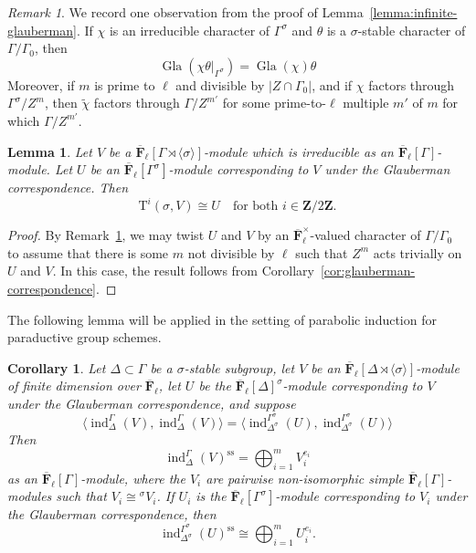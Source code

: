 \documentclass[reqno]{amsart}
\numberwithin{equation}{subsection}
\newcommand{\F}{\mathbf{F}}
\newcommand{\Z}{\mathbf{Z}}
\newcommand{\ol}[1]{\overline{#1}}
\DeclareMathOperator{\ind}{ind}
\DeclareMathOperator{\Gla}{Gla}
\newcommand{\rT}{\ensuremath{\mathrm{T}}\xspace}
\renewcommand{\ss}{\mathrm{ss}}
\newtheorem{lemma}[thm]{Lemma}
\newtheorem{cor}[thm]{Corollary}
\theoremstyle{remark}
\newtheorem{remark}[thm]{Remark}
\numberwithin{equation}{subsection}
\numberwithin{figure}{subsection}
\begin{document}
\begin{remark}\label{rmk:glauberman-twisting-equivariance}
We record one observation from the proof of Lemma~\ref{lemma:infinite-glauberman}. If $\chi$ is an irreducible character of $\Gamma^\sigma$ and $\theta$ is a $\sigma$-stable character of $\Gamma/\Gamma_0$, then
\[
\Gla(\chi\theta|_{\Gamma^\sigma})=\Gla(\chi)\theta
\]
Moreover, if $m$ is prime to $\ell$ and divisible by $|Z\cap\Gamma_0|$, and if $\chi$ factors through $\Gamma^\sigma/Z^m$, then $\widetilde\chi$ factors through $\Gamma/Z^{m'}$ for some prime-to-$\ell$ multiple $m'$ of $m$ for which $\Gamma/Z^{m'}$.
\end{remark}

\begin{lemma}\label{lemma:tate-cohom-infinite-glauberman}
    Let $V$ be a $\ol\F_\ell[\Gamma \rtimes \langle\sigma\rangle]$-module which is irreducible as an $\ol\F_\ell[\Gamma]$-module. Let $U$ be an $\ol\F_\ell[\Gamma^\sigma]$-module corresponding to $V$ under the Glauberman correspondence. Then
    \[
    \rT^i(\sigma, V) \cong U \quad \text{for both $i \in \Z/2\Z$}.
    \]
\end{lemma}

\begin{proof}
    By Remark~\ref{rmk:glauberman-twisting-equivariance}, we may twist $U$ and $V$ by an $\ol\F_\ell^\times$-valued character of $\Gamma/\Gamma_0$ to assume that there is some $m$ not divisible by $\ell$ such that $Z^m$ acts trivially on $U$ and $V$. In this case, the result follows from Corollary~\ref{cor:glauberman-correspondence}.
\end{proof}

The following lemma will be applied in the setting of parabolic induction for paraductive group schemes.

\begin{cor}\label{cor:induction-commutes-sometimes}
    Let $\Delta \subset \Gamma$ be a $\sigma$-stable subgroup, let $V$ be an $\ol\F_\ell[\Delta \rtimes \langle\sigma\rangle]$-module of finite dimension over $\ol\F_\ell$, let $U$ be the $\ol\F_\ell[\Delta]^\sigma$-module corresponding to $V$ under the Glauberman correspondence, and suppose
    \[
    \langle \ind_\Delta^\Gamma(V), \ind_\Delta^\Gamma(V) \rangle = \langle \ind_{\Delta^\sigma}^{\Gamma^\sigma}(U), \ind_{\Delta^\sigma}^{\Gamma^\sigma}(U)\rangle
    \]
    Then
    \[
    \ind_\Delta^\Gamma(V)^{\ss} = \bigoplus_{i=1}^m V_i^{e_i}
    \]
    as an $\ol\F_\ell[\Gamma]$-module, where the $V_i$ are pairwise non-isomorphic simple $\ol\F_\ell[\Gamma]$-modules such that $V_i \cong {}^\sigma V_i$. If $U_i$ is the $\ol\F_\ell[\Gamma^\sigma]$-module corresponding to $V_i$ under the Glauberman correspondence, then
    \[
    \ind_{\Delta^\sigma}^{\Gamma^\sigma}(U)^{\ss} \cong \bigoplus_{i=1}^m U_i^{e_i}.
    \]
\end{cor}
\end{document}
